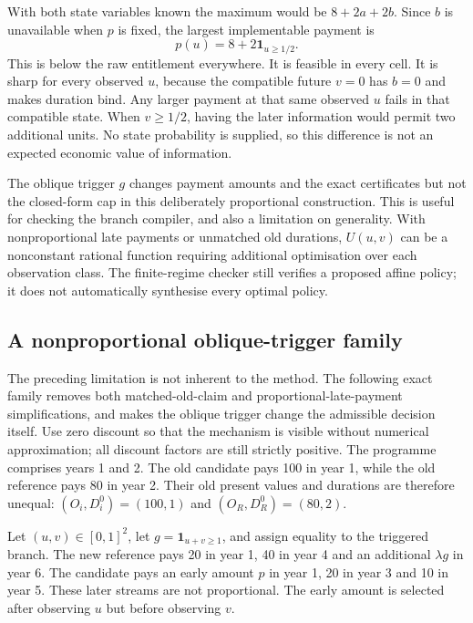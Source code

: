 \documentclass[11pt,a4paper]{article}
\begin{document}
With both state variables known the maximum would be $8+2a+2b$. Since $b$ is unavailable when $p$ is fixed, the largest implementable payment is
\begin{equation}\label{eq:multicap}
\boxed{p(u)=8+2\mathbf1_{u\geq1/2}.}
\end{equation}
This is below the raw entitlement everywhere. It is feasible in every cell. It is sharp for every observed $u$, because the compatible future $v=0$ has $b=0$ and makes duration bind. Any larger payment at that same observed $u$ fails in that compatible state. When $v\geq1/2$, having the later information would permit two additional units. No state probability is supplied, so this difference is not an expected economic value of information.

The oblique trigger $g$ changes payment amounts and the exact certificates but not the closed-form cap in this deliberately proportional construction. This is useful for checking the branch compiler, and also a limitation on generality. With nonproportional late payments or unmatched old durations, $U(u,v)$ can be a nonconstant rational function requiring additional optimisation over each observation class. The finite-regime checker still verifies a proposed affine policy; it does not automatically synthesise every optimal policy.

\subsection{A nonproportional oblique-trigger family}\label{sec:obliquefamily}
The preceding limitation is not inherent to the method. The following exact family removes both matched-old-claim and proportional-late-payment simplifications, and makes the oblique trigger change the admissible decision itself. Use zero discount so that the mechanism is visible without numerical approximation; all discount factors are still strictly positive. The programme comprises years 1 and 2. The old candidate pays 100 in year 1, while the old reference pays 80 in year 2. Their old present values and durations are therefore unequal: $(O_i,D_i^0)=(100,1)$ and $(O_R,D_R^0)=(80,2)$.

Let $(u,v)\in[0,1]^2$, let $g=\mathbf1_{u+v\geq1}$, and assign equality to the triggered branch. The new reference pays 20 in year 1, 40 in year 4 and an additional $\lambda g$ in year 6. The candidate pays an early amount $p$ in year 1, 20 in year 3 and 10 in year 5. These later streams are not proportional. The early amount is selected after observing $u$ but before observing $v$.
\end{document}
